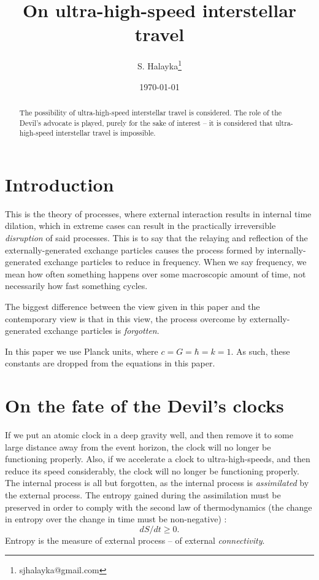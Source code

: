 \documentclass[12pt]{article}
\title{On ultra-high-speed interstellar travel}
\author{S. Halayka\footnote{sjhalayka@gmail.com}}
\date{\today}
\begin{document}
 
\maketitle

\begin{abstract}
The possibility of ultra-high-speed interstellar travel is considered.
The role of the Devil's advocate is played, purely for the sake of interest -- it is considered that ultra-high-speed interstellar travel is impossible.
\end{abstract}



\section{Introduction}
This is the theory of processes, where external interaction results in internal time dilation, which in extreme cases can result in the practically irreversible \textit{disruption} of said processes.
This is to say that the relaying and reflection of the externally-generated exchange particles causes the process formed by internally-generated exchange particles to reduce in frequency. 
When we say frequency, we mean how often something happens over some macroscopic amount of time, not necessarily how fast something cycles.

The biggest difference between the view given in this paper and the contemporary view is that in this view, the process overcome by externally-generated exchange particles is \textit{forgotten}.

In this paper we use Planck units, where $c = G = \hbar = k = 1$.
As such, these constants are dropped from the equations in this paper.




\section{On the fate of the Devil's clocks}
	If we put an atomic clock in a deep gravity well, and then remove it to some large distance away from the event horizon, the clock will no longer be functioning properly.
Also, if we accelerate a clock to ultra-high-speeds, and then reduce its speed considerably, the clock will no longer be functioning properly.
The internal process is all but forgotten, as the internal process is \textit{assimilated} by the external process.
The entropy gained during the assimilation must be preserved in order to comply with the second law of thermodynamics (the change in entropy over the change in time must be non-negative) \cite{jacobson}:
\begin{equation}
dS/dt \geq 0.
\end{equation}
Entropy is the measure of external process -- of external \textit{connectivity}.
\end{document}
